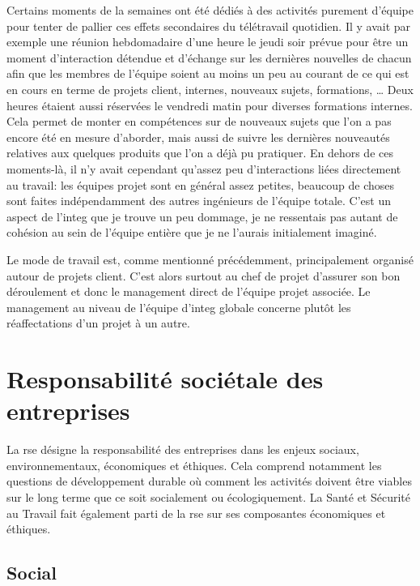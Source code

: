 \documentclass[12pt, oneside, a4paper, titlepage]{report}
\begin{document}
Certains moments de la semaines ont été dédiés à des activités purement d'équipe
pour tenter de pallier ces effets secondaires du télétravail quotidien. Il y
avait par exemple une réunion hebdomadaire d'une heure le jeudi soir prévue pour
être un moment d'interaction détendue et d'échange sur les dernières nouvelles
de chacun afin que les membres de l'équipe soient au moins un peu au courant de
ce qui est en cours en terme de projets client, internes, nouveaux sujets,
formations, \ldots{} Deux heures étaient aussi réservées le vendredi matin pour
diverses formations internes. Cela permet de monter en compétences sur de
nouveaux sujets que l'on a pas encore été en mesure d'aborder, mais aussi de
suivre les dernières nouveautés relatives aux quelques produits que l'on a déjà
pu pratiquer. En dehors de ces moments-là, il n'y avait cependant qu'assez peu
d'interactions liées directement au travail: les équipes projet sont en général
assez petites, beaucoup de choses sont faites indépendamment des autres
ingénieurs de l'équipe totale. C'est un aspect de l'\gls{integ} que je trouve un
peu dommage, je ne ressentais pas autant de cohésion au sein de l'équipe entière
que je ne l'aurais initialement imaginé.

Le mode de travail est, comme mentionné précédemment, principalement organisé
autour de projets client. C'est alors surtout au chef de projet d'assurer son
bon déroulement et donc le management direct de l'équipe projet associée. Le
management au niveau de l'équipe d'\gls{integ} globale concerne plutôt les
réaffectations d'un projet à un autre.

\chapter{Responsabilité sociétale des entreprises}%
\label{cha:rse}

La \gls{rse} désigne la responsabilité des entreprises dans les enjeux sociaux,
environnementaux, économiques et éthiques. Cela comprend notamment les questions
de développement durable où comment les activités doivent être viables sur le
long terme que ce soit socialement ou écologiquement. La Santé et Sécurité au
Travail fait également parti de la \gls{rse} sur ses composantes économiques et
éthiques.

\section{Social}%
\label{sec:rse::social}
\end{document}

